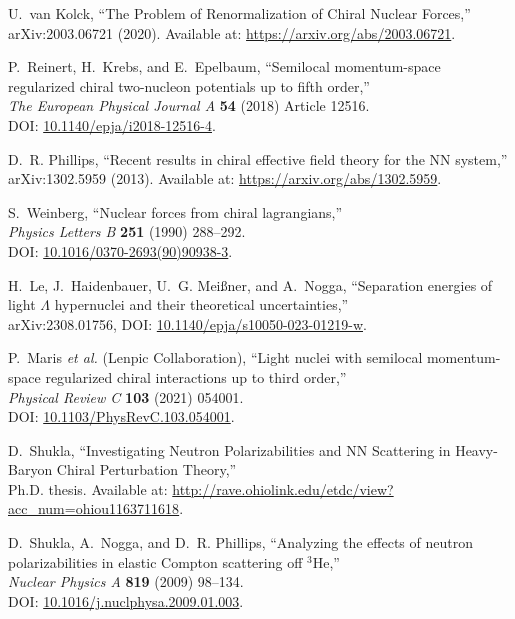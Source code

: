 \documentclass[12pt]{article}
\newcommand{\3}{\ss}
\numberwithin{equation}{section}
\begin{document}
\begin{thebibliography}{44}
U.~van Kolck, 
``The Problem of Renormalization of Chiral Nuclear Forces,''\\ 
arXiv:2003.06721 (2020). Available at: \url{https://arxiv.org/abs/2003.06721}.

P.~Reinert, H.~Krebs, and E.~Epelbaum, 
``Semilocal momentum-space regularized chiral two-nucleon potentials up to fifth order,''\\ 
\textit{The European Physical Journal A} \textbf{54} (2018) Article 12516.\\ 
DOI: \href{http://dx.doi.org/10.1140/epja/i2018-12516-4}{10.1140/epja/i2018-12516-4}.

D.~R. Phillips, 
``Recent results in chiral effective field theory for the NN system,''\\ 
arXiv:1302.5959 (2013). Available at: \url{https://arxiv.org/abs/1302.5959}.

S.~Weinberg, 
``Nuclear forces from chiral lagrangians,''\\ 
\textit{Physics Letters B} \textbf{251} (1990) 288–292.\\ 
DOI: \href{https://doi.org/10.1016/0370-2693(90)90938-3}{10.1016/0370-2693(90)90938-3}.

H.~Le, J.~Haidenbauer, U.~G. Mei\ss{}ner, and A.~Nogga, 
``Separation energies of light $\Lambda$ hypernuclei and their theoretical uncertainties,''\\ 
arXiv:2308.01756, DOI: \href{https://doi.org/10.1140/epja/s10050-023-01219-w}{10.1140/epja/s10050-023-01219-w}.

P.~Maris \textit{et al.} (Lenpic Collaboration), 
``Light nuclei with semilocal momentum-space regularized chiral interactions up to third order,''\\ 
\textit{Physical Review C} \textbf{103} (2021) 054001.\\ 
DOI: \href{http://dx.doi.org/10.1103/PhysRevC.103.054001}{10.1103/PhysRevC.103.054001}.

D.~Shukla, 
``Investigating Neutron Polarizabilities and NN Scattering in Heavy-Baryon Chiral Perturbation Theory,''\\ 
Ph.D. thesis. Available at: \url{http://rave.ohiolink.edu/etdc/view?acc_num=ohiou1163711618}.

D.~Shukla, A.~Nogga, and D.~R. Phillips, 
``Analyzing the effects of neutron polarizabilities in elastic Compton scattering off $^3$He,''\\ 
\textit{Nuclear Physics A} \textbf{819} (2009) 98–134.\\ 
DOI: \href{http://dx.doi.org/10.1016/j.nuclphysa.2009.01.003}{10.1016/j.nuclphysa.2009.01.003}.


\end{thebibliography}
\end{document}

